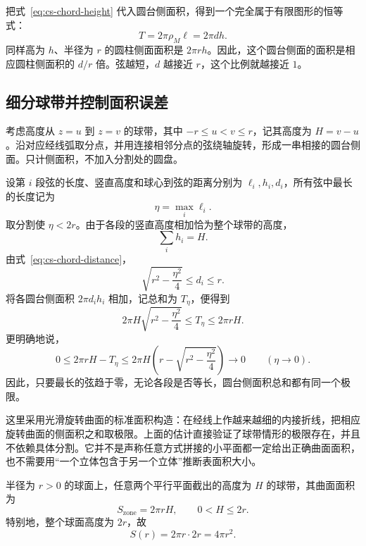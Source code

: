 \documentclass[UTF8]{ctexart}
\begin{document}
把式~\eqref{eq:cs-chord-height} 代入圆台侧面积，得到一个完全属于有限图形的恒等式：
\begin{equation}\label{eq:cs-zone-frustum}
  \boxed{T=2\pi\rho_M\ell=2\pi dh}.
\end{equation}
同样高为 $h$、半径为 $r$ 的圆柱侧面面积是 $2\pi rh$。因此，这个圆台侧面的面积是相应圆柱侧面积的 $d/r$ 倍。弦越短，$d$ 越接近 $r$，这个比例就越接近 $1$。

\subsection{细分球带并控制面积误差}

考虑高度从 $z=u$ 到 $z=v$ 的球带，其中 $-r\leq u<v\leq r$，记其高度为 $H=v-u$。沿对应经线弧取分点，并用连接相邻分点的弦绕轴旋转，形成一串相接的圆台侧面。只计侧面积，不加入分割处的圆盘。

设第 $i$ 段弦的长度、竖直高度和球心到弦的距离分别为 $\ell_i,h_i,d_i$，所有弦中最长的长度记为
\[
  \eta=\max_i\ell_i.
\]
取分割使 $\eta<2r$。由于各段的竖直高度相加恰为整个球带的高度，
\[
  \sum_i h_i=H.
\]
由式~\eqref{eq:cs-chord-distance}，
\[
  \sqrt{r^2-\frac{\eta^2}{4}}\leq d_i\leq r.
\]
将各圆台侧面积 $2\pi d_ih_i$ 相加，记总和为 $T_{\eta}$，便得到
\begin{equation}\label{eq:cs-zone-squeeze}
  2\pi H\sqrt{r^2-\frac{\eta^2}{4}}
  \leq T_{\eta}\leq2\pi rH.
\end{equation}
更明确地说，
\[
  0\leq2\pi rH-T_{\eta}
  \leq2\pi H\left(r-\sqrt{r^2-\frac{\eta^2}{4}}\right)
  \longrightarrow0\qquad(\eta\to0).
\]
因此，只要最长的弦趋于零，无论各段是否等长，圆台侧面积总和都有同一个极限。

这里采用光滑旋转曲面的标准面积构造：在经线上作越来越细的内接折线，把相应旋转曲面的侧面积之和取极限。上面的估计直接验证了球带情形的极限存在，并且不依赖具体分割。它并不是声称任意方式拼接的小平面都一定给出正确曲面面积，也不需要用“一个立体包含于另一个立体”推断表面积大小。

\begin{theorem}[球带面积与球面面积]
半径为 $r>0$ 的球面上，任意两个平行平面截出的高度为 $H$ 的球带，其曲面面积为
\begin{equation}\label{eq:cs-zone-area}
  \boxed{S_{\mathrm{zone}}=2\pi rH},\qquad 0<H\leq2r.
\end{equation}
特别地，整个球面高度为 $2r$，故
\begin{equation}\label{eq:cs-sphere-area}
  \boxed{S(r)=2\pi r\cdot2r=4\pi r^2}.
\end{equation}
\end{theorem}
\end{document}
